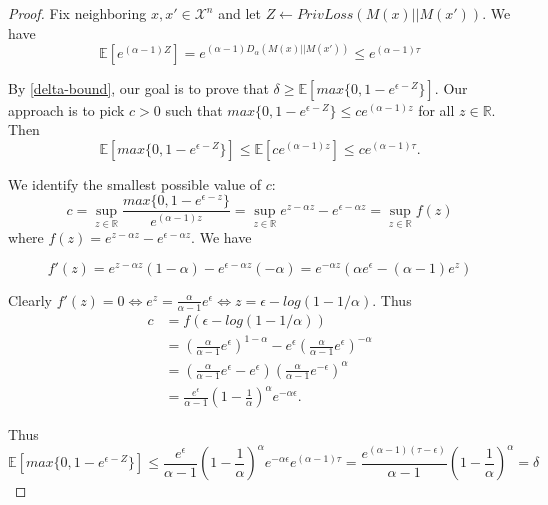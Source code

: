 \begin{proof}
Fix neighboring $x, x' \in  \mathcal{X}^n$ and let $Z \leftarrow PrivLoss(M(x) || M(x'))$. We have
\begin{equation}
    \mathbb{E}[e^{(\alpha - 1) Z}] = e^{(\alpha - 1)D_\alpha(M(x) || M(x'))} \leq e^{(\alpha - 1)\tau}
\end{equation}

By \ref{delta-bound}, our goal is to prove that $\delta \geq \mathbb{E}[max\{0, 1 - e^{\epsilon - Z} \}]$. 
Our approach is to pick $c > 0$ such that $max\{0, 1 - e^{\epsilon - Z} \} \leq c e^{(\alpha - 1) z}$ for all $z \in \mathbb{R}$. Then
\begin{equation}
    \mathbb{E}[max\{0, 1 - e^{\epsilon - Z} \}] \leq \mathbb{E}[c e^{(\alpha - 1) z}] \leq c e^{(\alpha - 1) \tau}.
\end{equation}

We identify the smallest possible value of $c$:
\begin{equation}
    c = \sup\limits_{z \in \mathbb{R}} \frac{max\{0, 1 - e^{\epsilon - z} \}}{e^{(\alpha -1)z}} 
    = \sup\limits_{z \in \mathbb{R}} e^{z - \alpha z} - e^{\epsilon - \alpha z} 
    = \sup\limits_{z \in \mathbb{R}}f(z)
\end{equation}
where $f(z) = e^{z - \alpha z} - e^{\epsilon - \alpha z}$. We have 

\begin{equation}
    f'(z) = e^{z - \alpha z} (1 - \alpha) - e^{\epsilon - \alpha z}(-\alpha) 
    = e^{-\alpha z} (\alpha e^\epsilon - (\alpha - 1) e^z)
\end{equation}

Clearly $f'(z) = 0 \Longleftrightarrow e^z = \frac{\alpha}{\alpha - 1}e^{\epsilon} \Longleftrightarrow z = \epsilon - log(1 - 1/\alpha)$. Thus
\begin{align}
    c &= f(\epsilon - log(1 - 1 / \alpha)) \\
    &= \left(\frac{\alpha}{\alpha - 1} e^\epsilon \right)^{1 - \alpha} - e^{\epsilon} \left(\frac{\alpha}{\alpha - 1} e^\epsilon \right)^{- \alpha} \\
    &= \left(\frac{\alpha}{\alpha - 1} e^\epsilon  - e^\epsilon \right)  \left(\frac{\alpha}{\alpha - 1} e^{-\epsilon} \right)^{\alpha} \\
    &= \frac{e^\epsilon}{\alpha - 1} \left(1 - \frac{1}{\alpha} \right)^\alpha  e^{-\alpha \epsilon}.
\end{align}

Thus
\begin{equation}
    \mathbb{E}[max\{0, 1 - e^{\epsilon - Z}\}] \leq \frac{e^\epsilon}{\alpha - 1}\left(1  - \frac{1}{\alpha} \right) ^\alpha e^{-\alpha \epsilon} e^{(\alpha -1)\tau}
    = \frac{e^{(\alpha - 1)(\tau - \epsilon)}}{\alpha - 1} \left( 1 - \frac{1}{\alpha} \right)^\alpha
    = \delta
\end{equation}

\end{proof}

